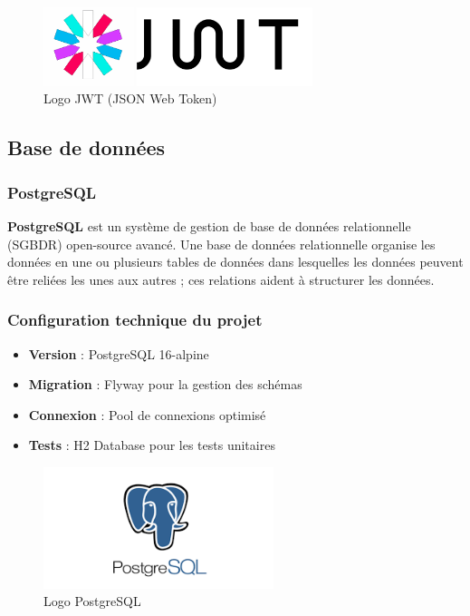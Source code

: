 \documentclass[12pt,a4paper]{report}
\begin{document}
\begin{figure}[H]
\centering
\includegraphics[width=0.7\textwidth]{latex_media/media/image25.png}
\caption{Logo JWT (JSON Web Token)}
\label{fig:logo-jwt}
\end{figure}

\subsection{Base de données}

\subsubsection{PostgreSQL}

\textbf{PostgreSQL} est un système de gestion de base de données relationnelle (SGBDR) open-source avancé. Une base de données relationnelle organise les données en une ou plusieurs tables de données dans lesquelles les données peuvent être reliées les unes aux autres ; ces relations aident à structurer les données.

\subsubsection{Configuration technique du projet}

\begin{itemize}
\item \textbf{Version} : PostgreSQL 16-alpine
\item \textbf{Migration} : Flyway pour la gestion des schémas
\item \textbf{Connexion} : Pool de connexions optimisé
\item \textbf{Tests} : H2 Database pour les tests unitaires
\end{itemize}

\begin{figure}[H]
\centering
\includegraphics[width=0.6\textwidth]{latex_media/media/image26.png}
\caption{Logo PostgreSQL}
\label{fig:logo-postgresql}
\end{figure}
\end{document}
